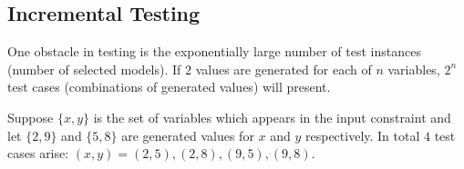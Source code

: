 \begin{comment}
\begin{figure}[ht]
\begin{minipage}[b]{1.0\linewidth}
\centering
\begin{tabular}{c@{\qquad}c}
\texttt{[image: IncWiden.png]} &
\texttt{[image: IncDeepen.png]} \\
\mbox{(a) Incremenal widening} & \mbox{(b) Incremental Deepening} \\
\end{tabular}
\caption{Incremental Widening and Deepening}
\label{fig:incwid}
\end{minipage}
\end{figure

\begin{figure}[ht]
\centering
\texttt{[image: depth-first-search.jpg]} 
\caption{\textbf{raSAT} design} 
\label{fig:depth-first-search} 
\end{figure} 
\end{comment}
\subsection{Incremental Testing}
One obstacle in testing is the exponentially large number of test instances (number of selected models). If $2$ values are generated for each of $n$ variables, $2^n$ test cases (combinations of generated values) will present. 
\begin{example}
Suppose $\{x, y\}$ is the set of variables which appears in the input constraint and let $\{2, 9\}$ and $\{5, 8\}$ are generated values for $x$ and $y$ respectively. In total $4$ test cases arise: $(x, y) = (2, 5), (2, 8), (9, 5), (9, 8)$.
\end{example}

